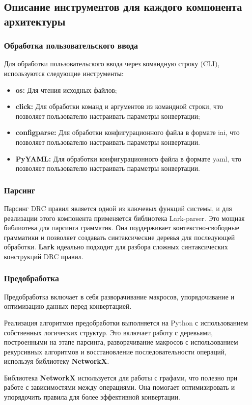 \subsection{Описание инструментов для каждого компонента архитектуры}

\subsubsection{Обработка пользовательского ввода}

Для обработки пользовательского ввода
через командную строку (CLI), используются следующие инструменты:

\begin{itemize}
	\item \textbf{os:} Для чтения исходных файлов;
	\item \textbf{click:} Для обработки команд
		и аргументов из командной строки,
		что позволяет пользователю настраивать параметры конвертации;
	\item \textbf{configparse:} Для обработки конфигурационного файла
		в формате ini,
		что позволяет пользователю настраивать параметры конвертации.
	\item \textbf{PyYAML:} Для обработки конфигурационного файла
		в формате yaml,
		что позволяет пользователю настраивать параметры конвертации.
\end{itemize}

\subsubsection{Парсинг}

Парсинг DRC правил является одной из ключевых функций системы,
и для реализации этого компонента применяется библиотека Lark-parser.
Это мощная библиотека для парсинга грамматик.
Она поддерживает контекстно-свободные грамматики
и позволяет создавать синтаксические деревья для последующей обработки.
\textbf{Lark} идеально подходит для разбора
сложных синтаксических конструкций DRC правил.

\subsubsection{Предобработка}

Предобработка включает в себя разворачивание макросов,
упорядочивание и оптимизацию данных перед конвертацией.\par
Реализация алгоритмов предобработки выполняется на Python
с использованием собственных логических структур.
Это включает работу с деревьями, построенными на этапе парсинга,
разворачивание макросов с использованием рекурсивных алгоритмов
и восстановление последовательности операций,
используя библиотеку \textbf{NetworkX}.\par
Библиотека \textbf{NetworkX} используется для работы с графами,
что полезно при работе с зависимостями между операциями.
Она помогает оптимизировать и упорядочить правила
для более эффективной конвертации.

